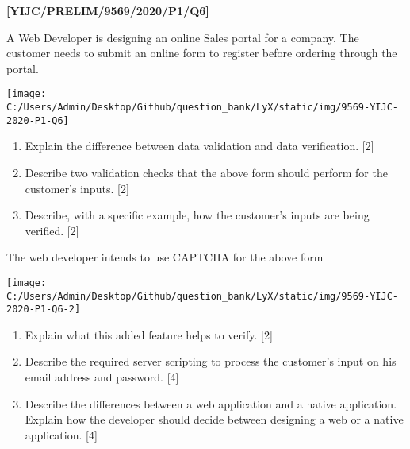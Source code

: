 \item \textbf{{[}YIJC/PRELIM/9569/2020/P1/Q6{]} }

A Web Developer is designing an online Sales portal for a company.
The customer needs to submit an online form to register before ordering
through the portal. 
\begin{center}
\texttt{[image: C:/Users/Admin/Desktop/Github/question\_bank/LyX/static/img/9569-YIJC-2020-P1-Q6]}
\par\end{center}
\begin{enumerate}
\item Explain the difference between data validation and data verification.
\hfill{}{[}2{]}
\item Describe two validation checks that the above form should perform
for the customer's inputs.\hfill{} {[}2{]}
\item Describe, with a specific example, how the customer's inputs are being
verified. \hfill{}{[}2{]}
\end{enumerate}
The web developer intends to use CAPTCHA for the above form 
\begin{center}
\texttt{[image: C:/Users/Admin/Desktop/Github/question\_bank/LyX/static/img/9569-YIJC-2020-P1-Q6-2]}
\par\end{center}
\begin{enumerate}
\item Explain what this added feature helps to verify. \hfill{}{[}2{]}
\item Describe the required server scripting to process the customer's input
on his email address and password. \hfill{}{[}4{]}
\item Describe the differences between a web application and a native application.
Explain how the developer should decide between designing a web or
a native application.\hfill{} {[}4{]}
\end{enumerate}